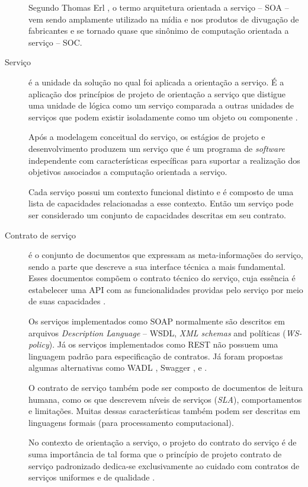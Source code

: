 \begin{description}
Segundo Thomas Erl \cite{erl2009web}, o termo arquitetura orientada a serviço --
SOA -- vem sendo amplamente utilizado na mídia e nos produtos de divugação de
fabricantes e se tornado quase que sinônimo de computação orientada a
serviço -- SOC.

\item [Serviço] é a unidade da solução no qual foi aplicada a orientação a
serviço. É a aplicação dos princípios de projeto de orientação a
serviço que distigue uma unidade de lógica como um serviço comparada a outras
unidades de serviços que podem existir isoladamente como um objeto ou
componente \cite{erl2009web}.

Após a modelagem conceitual do serviço, os estágios de projeto e desenvolvimento
produzem um serviço que é um programa de \textit{software} independente com
características específicas para suportar a realização dos objetivos associados
a computação orientada a serviço.

Cada serviço possui um contexto funcional distinto e é composto de uma lista
de capacidades relacionadas a esse contexto. Então um serviço pode ser
considerado um conjunto de capacidades descritas em seu contrato.


\item [Contrato de serviço] é o conjunto de documentos que expressam as
meta-informações do serviço, sendo a parte que descreve a
sua interface técnica a mais fundamental. Esses documentos compõem o contrato
técnico do serviço, cuja essência é estabelecer uma API com as funcionalidades providas pelo serviço por meio de
suas capacidades \cite{erl2009web}.

Os serviços implementados como \ws{} SOAP normalmente são descritos em
arquivos \ws{} \textit{Description Language} -- WSDL, \textit{XML
schemas} and políticas (\textit{WS-policy}). Já os serviços implementados como \ws{} REST não
possuem uma linguagem padrão para especificação de contratos. Já foram propostas
algumas alternativas como WADL \cite{hadley2006web}, Swagger \cite{swaggerSite},
e \neoidl{} \cite{lima2015neoidl}.

O contrato de serviço também pode ser composto de documentos de leitura humana,
como os que descrevem níveis de serviços (\textit{SLA}), comportamentos e
limitações. Muitas dessas características também podem ser descritas em
linguagens formais (para processamento computacional).

No contexto de orientação a serviço, o projeto do contrato do serviço é de suma
importância de tal forma que o princípio de projeto contrato de serviço
padronizado dedica-se exclusivamente ao cuidado com contratos de serviços
uniformes e de qualidade \cite{erl2009web}.

\end{description}


